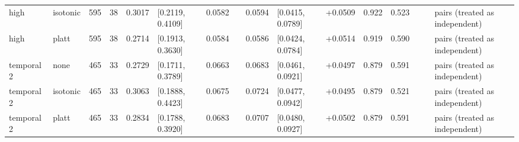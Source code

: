 \begin{table}[t]
\begin{tabular}{@{}llllllllllllllll@{}}
high & isotonic & 595 & 38 & 0.3017 & [0.2119, 0.4109] & 0.0582 &  & 0.0594 & [0.0415, 0.0789] & +0.0509 & 0.922 & 0.523 &  &  & pairs (treated as independent)\\
high & platt & 595 & 38 & 0.2714 & [0.1913, 0.3630] & 0.0584 &  & 0.0586 & [0.0424, 0.0784] & +0.0514 & 0.919 & 0.590 &  &  & pairs (treated as independent)\\
temporal 2 & none & 465 & 33 & 0.2729 & [0.1711, 0.3789] & 0.0663 &  & 0.0683 & [0.0461, 0.0921] & +0.0497 & 0.879 & 0.591 &  &  & pairs (treated as independent)\\
temporal 2 & isotonic & 465 & 33 & 0.3063 & [0.1888, 0.4423] & 0.0675 &  & 0.0724 & [0.0477, 0.0942] & +0.0495 & 0.879 & 0.521 &  &  & pairs (treated as independent)\\
temporal 2 & platt & 465 & 33 & 0.2834 & [0.1788, 0.3920] & 0.0683 &  & 0.0707 & [0.0480, 0.0927] & +0.0502 & 0.879 & 0.591 &  &  & pairs (treated as independent)\\
\bottomrule
\end{tabular}
\end{table}
